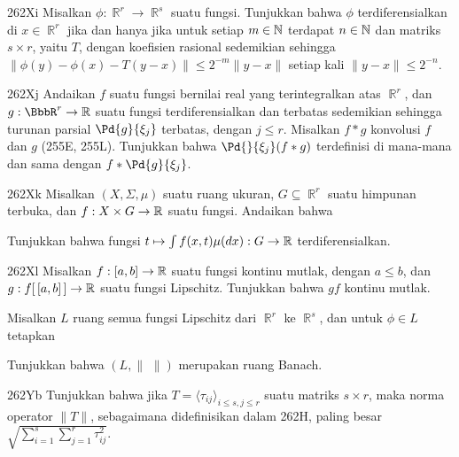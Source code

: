 {\spheader 262Xi Misalkan $\phi:\BbbR^r\to\BbbR^s$ suatu fungsi.
Tunjukkan bahwa $\phi$ terdiferensialkan di $x\in\BbbR^r$ jika dan hanya
jika untuk setiap $m\in\Bbb N$ terdapat $n\in\Bbb N$ dan matriks
$s\times r$, yaitu $T$, dengan koefisien rasional sedemikian sehingga
$\|\phi(y)-\phi(x)-T(y-x)\|\le 2^{-m}\|y-x\|$ setiap kali
$\|y-x\|\le 2^{-n}$.

\spheader 262Xj Andaikan $f$ suatu fungsi bernilai real yang terintegralkan
atas $\BbbR^r$, dan $g:\BbbR^r\to\Bbb R$ suatu fungsi terdiferensialkan
dan terbatas sedemikian sehingga turunan parsial $\Pd{g}{\xi_j}$ terbatas,
dengan $j\le r$. Misalkan $f*g$ konvolusi $f$ dan $g$ (255E, 255L).
Tunjukkan bahwa $\Pd{}{\xi_j}(f*g)$ terdefinisi di mana-mana dan sama
dengan $f*\Pd{g}{\xi_j}$. 

\spheader 262Xk Misalkan $(X,\Sigma,\mu)$ suatu ruang ukuran,
$G\subseteq\BbbR^r$ suatu himpunan terbuka, dan
$f:X\times G\to\Bbb R$ suatu fungsi. Andaikan bahwa


\noindent Tunjukkan bahwa fungsi
$t\mapsto\int f(x,t)\mu(dx):G\to\Bbb R$ terdiferensialkan.

\spheader 262Xl Misalkan $f:[a,b]\to\Bbb R$ suatu fungsi
kontinu mutlak, dengan $a\le b$, dan $g:f[\,[a,b]\,]\to\Bbb R$ suatu
fungsi Lipschitz. Tunjukkan bahwa $gf$ kontinu mutlak.

Misalkan $L$ ruang semua fungsi Lipschitz dari $\BbbR^r$ ke $\BbbR^s$,
dan untuk $\phi\in L$ tetapkan


\noindent Tunjukkan bahwa $(L,\|\,\,\|)$ merupakan ruang Banach.

\spheader 262Yb Tunjukkan bahwa jika
$T=\langle\tau_{ij}\rangle_{i\le s,j\le r}$ suatu matriks $s\times r$,
maka norma operator $\|T\|$, sebagaimana didefinisikan dalam 262H, paling
besar
$\sqrt{\sum_{i=1}^s\sum_{j=1}^r\tau_{ij}^2}$.

}
